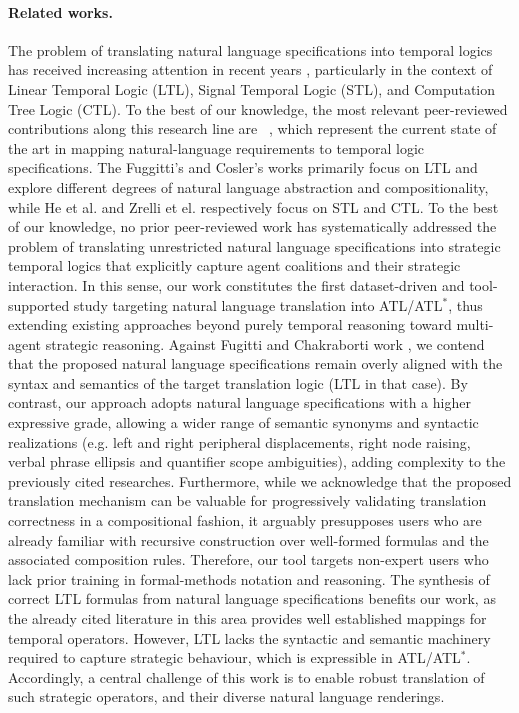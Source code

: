 \paragraph{Related works.} 
The problem of translating natural language specifications into temporal logics has received increasing attention in recent years \cite{cosler2023iterative,Finkbeiner2020TeachingTL,nayak2022req2spec,wu2022autoformalization}, particularly in the context of Linear Temporal Logic (LTL), Signal Temporal Logic (STL), and Computation Tree Logic (CTL). To the best of our knowledge, the most relevant peer-reviewed contributions along this research line are ~\cite{cosler2023nl2spec,fuggitti2023nl2ltl,DBLP:conf/icse/HeBNIG22,DBLP:journals/jss/ZrelliMAMSN26,mendoza2024translating}, which represent the current state of the art in mapping natural-language requirements to temporal logic specifications. The Fuggitti's and Cosler's works \cite{fuggitti2023nl2ltl,cosler2023nl2spec} primarily focus on LTL and explore different degrees of natural language abstraction and compositionality, while He et al. \cite{DBLP:conf/icse/HeBNIG22} and Zrelli et el. \cite{DBLP:journals/jss/ZrelliMAMSN26} respectively focus on STL and CTL. To the best of our knowledge, no prior peer-reviewed work has systematically addressed the problem of translating unrestricted natural language specifications into strategic temporal logics that explicitly capture agent coalitions and their strategic interaction. In this sense, our work constitutes the first dataset-driven and tool-supported study targeting natural language translation into ATL/ATL$^\ast$, thus extending existing approaches beyond purely temporal reasoning toward multi-agent strategic reasoning. Against Fugitti and Chakraborti work \cite{fuggitti2023nl2ltl}, we contend that the proposed natural language specifications remain overly aligned with the syntax and semantics of the target translation logic (LTL in that case). By contrast, our approach adopts natural language specifications with a higher expressive grade, allowing a wider range of semantic synonyms and syntactic realizations (e.g. left and right peripheral displacements, right node raising, verbal phrase ellipsis and quantifier scope ambiguities), adding complexity to the previously cited researches. Furthermore, while we acknowledge that the proposed translation mechanism can be valuable for progressively validating translation correctness in a compositional fashion, it arguably presupposes users who are already familiar with recursive construction over well-formed formulas and the associated composition rules. Therefore, our tool targets non-expert users who lack prior training in formal-methods notation and reasoning. The synthesis of correct LTL formulas from natural language specifications benefits our work, as the already cited literature in this area provides well established mappings for temporal operators. However, LTL lacks the syntactic and semantic machinery required to capture strategic behaviour, which is expressible in ATL/ATL$^\ast$. Accordingly, a central challenge of this work is to enable robust translation of such strategic operators, and their diverse natural language renderings.


